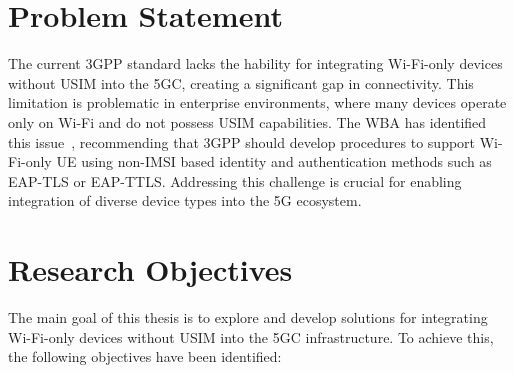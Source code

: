 \section{Problem Statement}

The current \ac{3GPP} standard lacks the hability for integrating Wi-Fi-only devices without \ac{USIM} into the \acl{5GC}, creating a significant gap in connectivity. This limitation is problematic in enterprise environments, where many devices operate only on Wi-Fi and do not possess \ac{USIM} capabilities. The \ac{WBA} has identified this issue~\cite{wba-04-2021-p59}, recommending that \ac{3GPP} should develop procedures to support Wi-Fi-only \ac{UE} using non-\acs{IMSI} based identity and authentication methods such as \ac{EAP-TLS} or \ac{EAP-TTLS}. Addressing this challenge is crucial for enabling integration of diverse device types into the \ac{5G} ecosystem.

\section{Research Objectives}

The main goal of this thesis is to explore and develop solutions for integrating Wi-Fi-only devices without \ac{USIM} into the \ac{5GC} infrastructure. To achieve this, the following objectives have been identified:

